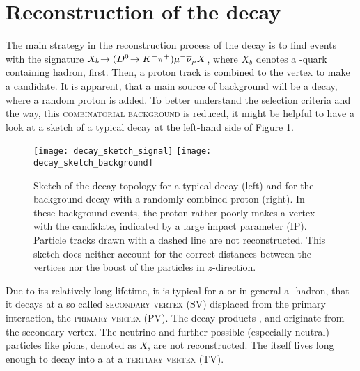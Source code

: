 \section{Reconstruction of the decay \LbToDpmunuX}
The main strategy in the reconstruction process of the decay \LbToDpmunuX is to find events with the signature $X_{b}\!\rightarrow ({{D}^0}\!\rightarrow {\ensuremath{{K}^-}}{\ensuremath{{\pi}^+}}) {\mu^-} {{\overline{\nu}}_\mu} X$, where $X_b$ denotes a \bquark-quark containing hadron, first.
Then, a proton track is combined to the \Dz\mun vertex to make a \LbToDpmunuX candidate.
It is apparent, that a main source of background will be a  decay, where a random proton is added.
To better understand the selection criteria and the way, this \textsc{combinatorial background} is reduced, it might be helpful to have a look at a sketch of a typical \LbToDpmunuX decay at the left-hand side of Figure \ref{fig:DecaySketch}.
\begin{figure}[tb]
	\centering
	\texttt{[image: decay\_sketch\_signal]}
	\texttt{[image: decay\_sketch\_background]}
	\caption{
        Sketch of the decay topology for a typical \LbToDpmunuX decay (left) and for the background decay  with a randomly combined proton (right).
        In these background events, the proton rather poorly makes a vertex with the \Dz\mun candidate, indicated by a large impact parameter (IP).
        Particle tracks drawn with a dashed line are not reconstructed.
        This sketch does neither account for the correct distances between the vertices nor the boost of the particles in $z$-direction.
    }
	\label{fig:DecaySketch}
\end{figure}
Due to its relatively long lifetime, it is typical for a \Lb or in general a \bquark-hadron, that it decays at a so called \textsc{secondary vertex (SV)} displaced from the primary \proton\proton interaction, the \textsc{primary vertex (PV)}.
The decay products \Dz, \mun and \proton  originate from the secondary vertex. 
The neutrino and further possible (especially neutral) particles like pions, denoted as $X$, are not reconstructed.
The \Dz itself lives long enough to decay into a \Km\pip at a \textsc{tertiary vertex (TV)}.

